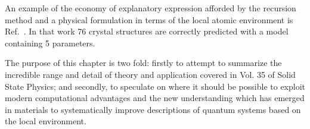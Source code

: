 
An example of the economy of explanatory expression afforded by the recursion method
and a physical formulation in terms of the local atomic environment
is Ref.~\cite{johannes76}. In that work 76 crystal structures are correctly predicted 
with a model containing 5 parameters.

The purpose of this chapter is two fold: firstly to attempt to summarize the incredible range and
detail of theory and application covered in Vol. 35 of Solid State Physics; and secondly, to speculate on where 
it should be possible to exploit modern computational advantages and the new understanding 
which has emerged in materials to systematically improve descriptions of quantum systems based
on the local environment. 

